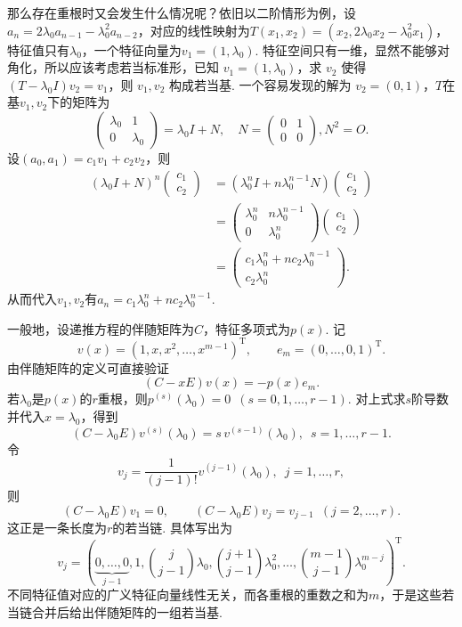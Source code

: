那么存在重根时又会发生什么情况呢？依旧以二阶情形为例，设$a_n=2\lambda_0a_{n-1}-\lambda_0^2a_{n-2}$，对应的线性映射为$T(x_1,x_2)=(x_2,2\lambda_0x_2-\lambda_0^2x_1)$，特征值只有$\lambda_0$，一个特征向量为$v_1=(1,\lambda_0)$. 特征空间只有一维，显然不能够对角化，所以应该考虑若当标准形，已知 $v_1=(1,\lambda_0)$，求 $v_2$ 使得 $(T-\lambda_0I)v_2=v_1$，则 $v_1,v_2$ 构成若当基. 一个容易发现的解为 $v_2=(0,1)$，$T$在基$v_1,v_2$下的矩阵为
\[
    \begin{pmatrix}
        \lambda_0 & 1 \\ 0 & \lambda_0
    \end{pmatrix}
    =\lambda_0I+N,\quad N=\begin{pmatrix}0&1\\0&0\end{pmatrix}, N^2=O.
\]
设$(a_0,a_1)=c_1v_1+c_2v_2$，则
\begin{align*}
    (\lambda_0I+N)^n\begin{pmatrix}c_1\\c_2\end{pmatrix}
     &=(\lambda_0^nI+n\lambda_0^{n-1}N)\begin{pmatrix}c_1\\c_2\end{pmatrix}              \\
     &=\begin{pmatrix}
            \lambda_0^n & n\lambda_0^{n-1} \\ 0 & \lambda_0^n
        \end{pmatrix}
        \begin{pmatrix}c_1\\c_2\end{pmatrix}                                             \\
     &=\begin{pmatrix}
            c_1\lambda_0^n+nc_2\lambda_0^{n-1} \\ c_2\lambda_0^n
        \end{pmatrix}.
\end{align*}
从而代入$v_1, v_2$有$a_n = c_1 \lambda_0^n + n c_2 \lambda_0^{n - 1}$.

一般地，设递推方程的伴随矩阵为$C$，特征多项式为$p(x)$. 记
\[
    v(x)=(1,x,x^2,\ldots,x^{m-1})^{\mathrm{T}},\qquad e_m=(0,\ldots,0,1)^{\mathrm{T}}.
\]
由伴随矩阵的定义可直接验证
\[
    (C-xE)v(x)=-p(x)e_m.
\]
若$\lambda_0$是$p(x)$的$r$重根，则$p^{(s)}(\lambda_0)=0\enspace(s=0,1,\ldots,r-1)$. 对上式求$s$阶导数并代入$x=\lambda_0$，得到
\[
    (C-\lambda_0E)v^{(s)}(\lambda_0)=s\,v^{(s-1)}(\lambda_0),\enspace s=1,\ldots,r-1.
\]
令
\[
    v_j=\frac{1}{(j-1)!}v^{(j-1)}(\lambda_0),\enspace j=1,\ldots,r,
\]
则
\[
    (C-\lambda_0E)v_1=0,\qquad (C-\lambda_0E)v_j=v_{j-1}\enspace(j=2,\ldots,r).
\]
这正是一条长度为$r$的若当链. 具体写出为
\[
    v_j=(\underbrace{0,\ldots,0}_{j-1},1,\binom{j}{j-1}\lambda_0,\binom{j+1}{j-1}\lambda_0^2,\ldots,\binom{m-1}{j-1}\lambda_0^{m-j})^{\mathrm{T}}.
\]
不同特征值对应的广义特征向量线性无关，而各重根的重数之和为$m$，于是这些若当链合并后给出伴随矩阵的一组若当基.

